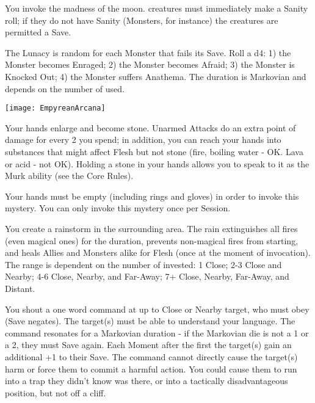 {\MYSTERY [
  Name = Lunacy,
  Link = arcana-mystery-lunacy,
  Paradigm = Mind,
  Save = Y (neg.),
  Duration = Markovian,
  Target = Close or Nearby Target(s)
]

You invoke the madness of the moon.  \DICE creatures must immediately make a Sanity roll; if they do not have Sanity (Monsters, for instance) the creatures are permitted a Save.

The Lunacy is random for each Monster that fails its Save.  Roll a d4:  1) the Monster becomes Enraged; 2) the Monster becomes Afraid; 3) the Monster is Knocked Out; 4) the Monster suffers Anathema.  The duration is Markovian and depends on the number of \DICE used.

  \begin{center}
  \texttt{[image: EmpyreanArcana]}
  \end{center}


\MYSTERY [
  Name = Mountainhands,
  Link = arcana-mystery-mountainhands,
  Paradigm = Biomancy,
  Save = N,
  Duration = Session,
  Target = Self
]

Your hands enlarge and become stone.  Unarmed Attacks do an extra point of damage for every 2 \DICE you spend; in addition, you can reach your hands into substances that might affect Flesh but not stone (fire, boiling water - OK.  Lava or acid - not OK).  Holding a stone in your hands allows you to speak to it as the Murk ability (see the Core Rules). 

Your hands must be empty (including rings and gloves) in order to invoke this mystery. You can only invoke this mystery once per Session.

\MYSTERY [
  Name = Rainburst,
  Link = arcana-mystery-rainburst,
  Paradigm = Elements,
  Save = n/a,
  Duration = Combat or \SUM Minutes,
  Target = See Below
]

You create a rainstorm in the surrounding area.  The rain extinguishes all fires (even magical ones) for the duration, prevents non-magical fires from starting, and heals Allies and Monsters alike for \SUMDICE Flesh (once at the moment of invocation).  The range is dependent on the number of \DICE invested: 1 Close; 2-3 Close and Nearby; 4-6 Close, Nearby, and Far-Away; 7+ Close, Nearby, Far-Away, and Distant.

\MYSTERY [
  Name = Resonating Command,
  Link = arcana-mystery-resonating-command,
  Paradigm = Mind,
  Save = Y (neg.),
  Duration = Markovian,
  Target = Nearby Target(s)
]

You shout a one word command at up to \DICE Close or Nearby target, who must obey (Save negates).  The target(s) must be able to understand your language.  The command resonates for a Markovian duration - if the Markovian die is not a 1 or a 2, they must Save again.  Each Moment after the first the target(s) gain an additional +1 to their Save.  The command cannot directly cause the target(s) harm or force them to commit a harmful action.  You could cause them to run into a trap they didn't know was there, or into a tactically disadvantageous position, but not off a cliff.

}
